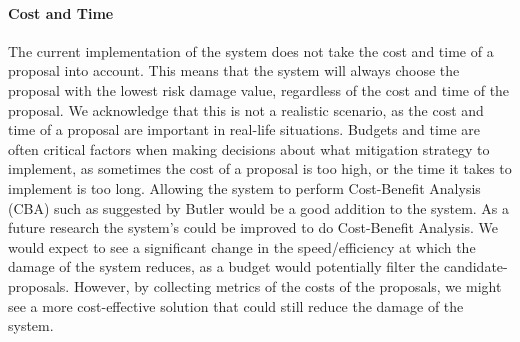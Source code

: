 \paragraph{Cost and Time}
The current implementation of the system does not take the cost and time of a proposal into account. This means that the system will always choose the proposal with the lowest risk damage value, regardless of the cost and time of the proposal. We acknowledge that this is not a realistic scenario, as the cost and time of a proposal are important in real-life situations. Budgets and time are often critical factors when making decisions about what mitigation strategy to implement, as sometimes the cost of a proposal is too high, or the time it takes to implement is too long. Allowing the system to perform Cost-Benefit Analysis (CBA) such as suggested by Butler \cite{butler2002security} would be a good addition to the system. As a future research the system's  could be improved to do Cost-Benefit Analysis. We would expect to see a significant change in the speed/efficiency at which the damage of the system reduces, as a budget would potentially filter the candidate-proposals. However, by collecting metrics of the costs of the proposals, we might see a more cost-effective solution that could still reduce the damage of the system.

